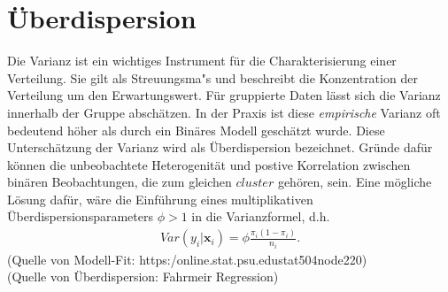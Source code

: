 \documentclass[12pt]{scrreprt}
\begin{document}
\section{Überdispersion}
Die Varianz ist ein wichtiges Instrument für die Charakterisierung einer Verteilung. Sie gilt als Streuungsma"s und beschreibt die Konzentration der Verteilung um den Erwartungswert. Für gruppierte Daten lässt sich die Varianz innerhalb der Gruppe abschätzen. In der Praxis ist diese \textit{empirische} Varianz oft bedeutend höher als durch ein Binäres Modell geschätzt wurde. Diese Unterschätzung der Varianz wird als Überdispersion bezeichnet. Gründe dafür können die unbeobachtete Heterogenität und postive Korrelation zwischen binären Beobachtungen, die zum gleichen $cluster$ gehören, sein. Eine mögliche Lösung dafür, wäre die Einführung eines multiplikativen Überdispersionsparameters $\phi > 1$ in die Varianzformel, d.h.
\begin{align}
Var(y_{i}|\textbf{x}_{i})=\phi \frac{\pi_{i}(1-\pi_{i})}{n_{i}}.
\end{align}
(Quelle von Modell-Fit: https:\//online.stat.psu.edu\/stat504\/node\/220\/) \\
(Quelle von Überdispersion: Fahrmeir Regression)
\end{document}
